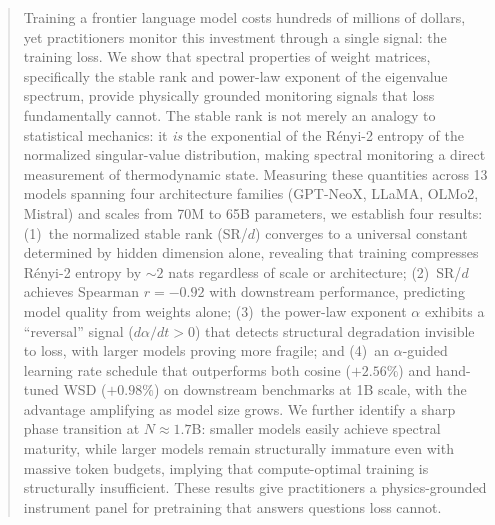 \begin{abstract}
Training a frontier language model costs hundreds of millions of dollars, yet practitioners monitor this investment through a single signal: the training loss.
We show that spectral properties of weight matrices, specifically the stable rank and power-law exponent of the eigenvalue spectrum, provide physically grounded monitoring signals that loss fundamentally cannot.
The stable rank is not merely an analogy to statistical mechanics: it \emph{is} the exponential of the R\'{e}nyi-2 entropy of the normalized singular-value distribution, making spectral monitoring a direct measurement of thermodynamic state.
Measuring these quantities across 13 models spanning four architecture families (GPT-NeoX, LLaMA, OLMo2, Mistral) and scales from 70M to 65B parameters, we establish four results:
(1)~the normalized stable rank (SR/$d$) converges to a universal constant determined by hidden dimension alone, revealing that training compresses R\'{e}nyi-2 entropy by ${\sim}2$ nats regardless of scale or architecture;
(2)~SR/$d$ achieves Spearman $r = -0.92$ with downstream performance, predicting model quality from weights alone;
(3)~the power-law exponent $\alpha$ exhibits a ``reversal'' signal ($d\alpha/dt > 0$) that detects structural degradation invisible to loss, with larger models proving more fragile;
and (4)~an $\alpha$-guided learning rate schedule that outperforms both cosine ($+2.56\%$) and hand-tuned WSD ($+0.98\%$) on downstream benchmarks at 1B scale, with the advantage amplifying as model size grows.
We further identify a sharp phase transition at $N \approx 1.7$B: smaller models easily achieve spectral maturity, while larger models remain structurally immature even with massive token budgets, implying that compute-optimal training is structurally insufficient.
These results give practitioners a physics-grounded instrument panel for pretraining that answers questions loss cannot.
\end{abstract}

